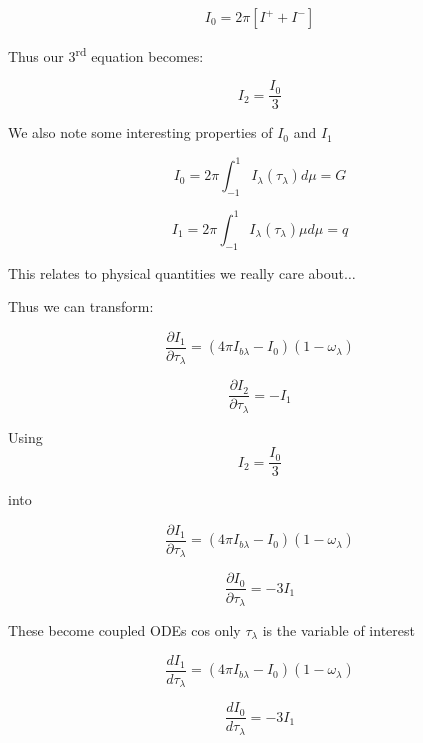 \documentclass[12pt]{article}
\renewcommand{\_}{\kern-1.5pt\textunderscore\kern-1.5pt}
\begin{document}
\begin{itemize}
 \[ I_{0}=2 \pi   \left[ I^{+}+I^{-} \right]  \] \par

Thus our 3\textsuperscript{rd} equation becomes:\par

 \[ I_{2}=\frac{I_{0}}{3} \] \par

We also note some interesting properties of  \( I_{0} \)  and  \( I_{1} \) \par

 \[ I_{0}=2 \pi  \int _{-1}^{1}I_{ \lambda } \left(  \tau_{ \lambda } \right) d \mu =G \] \par

 \[ I_{1}=2 \pi  \int _{-1}^{1}I_{ \lambda } \left(  \tau_{ \lambda } \right)  \mu  d \mu =q \] \par

This relates to physical quantities we really care about$ \ldots $ \par


\vspace{\baselineskip}
Thus we can transform:\par

 \[ \frac{ \partial I_{1}}{ \partial  \tau_{ \lambda }}= \left( 4 \pi I_{b \lambda }-I_{0} \right)  \left( 1- \omega _{ \lambda } \right)  \] \par

 \[ \frac{ \partial I_{2}}{ \partial  \tau_{ \lambda }}=-I_{1} \] \par

Using  \(  \)  \[ I_{2}=\frac{I_{0}}{3} \] \par

into\par

 \[ \frac{ \partial I_{1}}{ \partial  \tau_{ \lambda }}= \left( 4 \pi I_{b \lambda }-I_{0} \right)  \left( 1- \omega _{ \lambda } \right)  \] \par

 \[ \frac{ \partial I_{0}}{ \partial  \tau_{ \lambda }}=-3I_{1} \] \par

These become coupled ODEs cos only  \(  \tau_{ \lambda } \)  is the variable of interest\par

 \[ \frac{dI_{1}}{d \tau_{ \lambda }}= \left( 4 \pi I_{b \lambda }-I_{0} \right)  \left( 1- \omega _{ \lambda } \right)  \] \par

 \[ \frac{dI_{0}}{d \tau_{ \lambda }}=-3I_{1} \] \par


\end{itemize}
\end{document}
